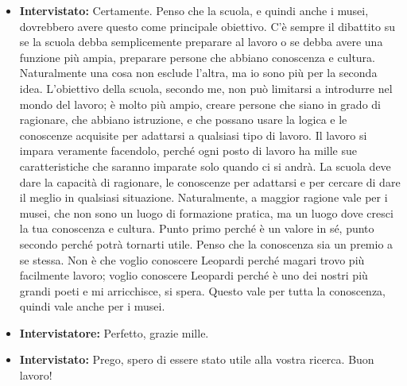 \documentclass{article}
\begin{document}
\begin{itemize}
    \item \textbf{Intervistato:} Certamente. Penso che la scuola, e quindi anche i musei, dovrebbero avere questo come principale obiettivo. C'è sempre il dibattito su se la scuola debba semplicemente preparare al lavoro o se debba avere una funzione più ampia, preparare persone che abbiano conoscenza e cultura. Naturalmente una cosa non esclude l'altra, ma io sono più per la seconda idea. L'obiettivo della scuola, secondo me, non può limitarsi a introdurre nel mondo del lavoro; è molto più ampio, creare persone che siano in grado di ragionare, che abbiano istruzione, e che possano usare la logica e le conoscenze acquisite per adattarsi a qualsiasi tipo di lavoro. Il lavoro si impara veramente facendolo, perché ogni posto di lavoro ha mille sue caratteristiche che saranno imparate solo quando ci si andrà. La scuola deve dare la capacità di ragionare, le conoscenze per adattarsi e per cercare di dare il meglio in qualsiasi situazione. Naturalmente, a maggior ragione vale per i musei, che non sono un luogo di formazione pratica, ma un luogo dove cresci la tua conoscenza e cultura. Punto primo perché è un valore in sé, punto secondo perché potrà tornarti utile. Penso che la conoscenza sia un premio a se stessa. Non è che voglio conoscere Leopardi perché magari trovo più facilmente lavoro; voglio conoscere Leopardi perché è uno dei nostri più grandi poeti e mi arricchisce, si spera. Questo vale per tutta la conoscenza, quindi vale anche per i musei.
    \item \textbf{Intervistatore:} Perfetto, grazie mille.
    \item \textbf{Intervistato:} Prego, spero di essere stato utile alla vostra ricerca. Buon lavoro!
\end{itemize}
\end{document}
